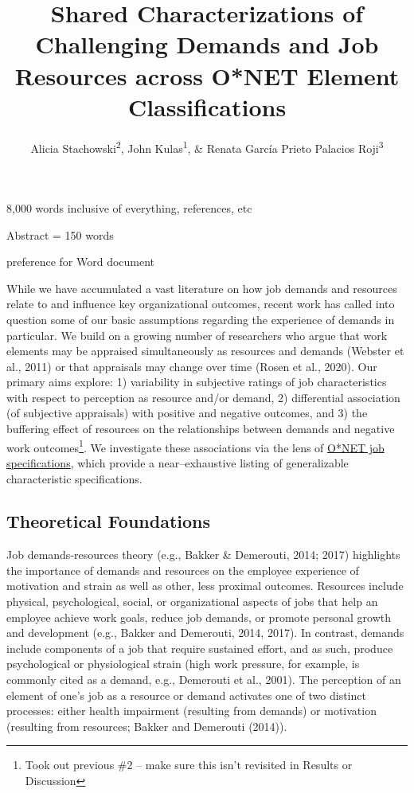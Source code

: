 \documentclass[
  man]{apa7}
\title{Shared Characterizations of Challenging Demands and Job Resources across O*NET Element Classifications}
\author{Alicia Stachowski\textsuperscript{2}, John Kulas\textsuperscript{1}, \& Renata García Prieto Palacios Roji\textsuperscript{3}}
\date{}
\affiliation{\vspace{0.5cm}\textsuperscript{1} eRg\\\textsuperscript{2} University of Wisconsin - Stout\\\textsuperscript{3} PepsiCo}
\begin{document}
\maketitle

8,000 words inclusive of everything, references, etc

Abstract = 150 words

preference for Word document

While we have accumulated a vast literature on how job demands and resources relate to and influence key organizational outcomes, recent work has called into question some of our basic assumptions regarding the experience of demands in particular. We build on a growing number of researchers who argue that work elements may be appraised simultaneously as resources and demands (Webster et al., 2011) or that appraisals may change over time (Rosen et al., 2020). Our primary aims explore: 1) variability in subjective ratings of job characteristics with respect to perception as resource and/or demand, 2) differential association (of subjective appraisals) with positive and negative outcomes, and 3) the buffering effect of resources on the relationships between demands and negative work outcomes\footnote{Took out previous \#2 -- make sure this isn't revisited in Results or Discussion}. We investigate these associations via the lens of \href{https://www.onetcenter.org/content.html}{O*NET job specifications}, which provide a near--exhaustive listing of generalizable characteristic specifications.

\subsection{Theoretical Foundations}\label{theoretical-foundations}

Job demands-resources theory (e.g., Bakker \& Demerouti, 2014; 2017) highlights the importance of demands and resources on the employee experience of motivation and strain as well as other, less proximal outcomes. Resources include physical, psychological, social, or organizational aspects of jobs that help an employee achieve work goals, reduce job demands, or promote personal growth and development (e.g., Bakker and Demerouti, 2014, 2017). In contrast, demands include components of a job that require sustained effort, and as such, produce psychological or physiological strain (high work pressure, for example, is commonly cited as a demand, e.g., Demerouti et al., 2001). The perception of an element of one's job as a resource or demand activates one of two distinct processes: either health impairment (resulting from demands) or motivation (resulting from resources; Bakker and Demerouti (2014)).
\end{document}
